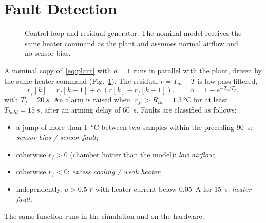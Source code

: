 \documentclass[conference,a4paper]{IEEEtran}
\begin{document}
\section{Fault Detection}\label{sec:fd}
\begin{figure}[t]
\centering
{}
\caption{Control loop and residual generator. The nominal model receives the same heater command as
the plant and assumes normal airflow and no sensor bias.}\label{fig:block}
\end{figure}

A nominal copy of~\eqref{eq:plant} with $a=1$ runs in parallel with the plant, driven by the same
heater command (Fig.~\ref{fig:block}). The residual $r=T_m-\hat T$ is low-pass filtered,
\begin{equation}
r_f[k] = r_f[k-1] + \alpha\,(r[k]-r_f[k-1]),\qquad \alpha = 1-e^{-T_s/T_f},
\end{equation}
with $T_f=\SI{20}{s}$. An alarm is raised when $|r_f|>R_{th}=\SI{1.3}{\celsius}$ for at least
$T_{hold}=\SI{15}{s}$, after an arming delay of \SI{60}{s}. Faults are classified as follows:
\begin{itemize}
\item a jump of more than \SI{1}{\celsius} between two samples within the preceding \SI{90}{s}:
\emph{sensor bias / sensor fault};
\item otherwise $r_f>0$ (chamber hotter than the model): \emph{low airflow};
\item otherwise $r_f<0$: \emph{excess cooling / weak heater};
\item independently, $u>\SI{0.5}{V}$ with heater current below \SI{0.05}{A} for \SI{15}{s}:
\emph{heater fault}.
\end{itemize}
The same function runs in the simulation and on the hardware.
\end{document}
